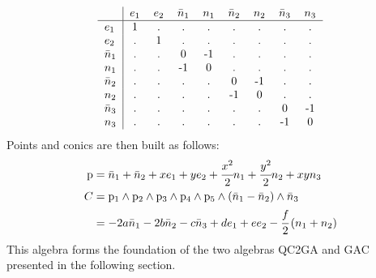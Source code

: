 \documentclass{birkjour}
\begin{document}
\begin{equation}
    \begin{tabular}{l|cccccccc}
    & \(e_1\)
    & \(e_2\)
    & \(\bar n_1\)
    & \(     n_1\)
    & \(\bar n_2\)
    & \(     n_2\)
    & \(\bar n_3\)
    & \(     n_3\) \\
    \hline
    \(e_1         \)  & 1 & . & . & . & . & . & . & . \\
    \(e_2         \)  & . & 1 & . & . & . & . & . & . \\
    \(\bar n_1    \)  & . & . & 0 &-1 & . & . & . & . \\
    \(     n_1    \)  & . & . &-1 & 0 & . & . & . & . \\
    \(\bar n_2    \)  & . & . & . & . & 0 &-1 & . & . \\
    \(     n_2    \)  & . & . & . & . &-1 & 0 & . & . \\
    \(\bar n_3    \)  & . & . & . & . & . & . & 0 &-1 \\
    \(     n_3    \)  & . & . & . & . & . & . &-1 & 0
    \end{tabular}
\end{equation}
Points and conics are then built as follows:
\begin{align}
    \mathrm{p} &=  \bar n_1 + \bar n_2 + x  e_1 + y e_2 + \cfrac{x^2}{2} n_1 + \cfrac{y^2}{2} n_2 + xy n_3\\
    C &= \mathrm{p}_1 \wedge \mathrm{p}_2 \wedge \mathrm{p}_3 \wedge \mathrm{p}_4 \wedge \mathrm{p}_5 \wedge \left(\bar n_1 - \bar n_2\right) \wedge \bar n_3 \\
    &= -2 a \bar n_1 - 2 b \bar n_2 - c \bar n_3+ d e_1 + e e_2 - \cfrac{f}{2} \left(n_1 + n_2\right)
\end{align}
This algebra forms the foundation of the two algebras QC2GA and GAC presented in the following section.


\end{document}
